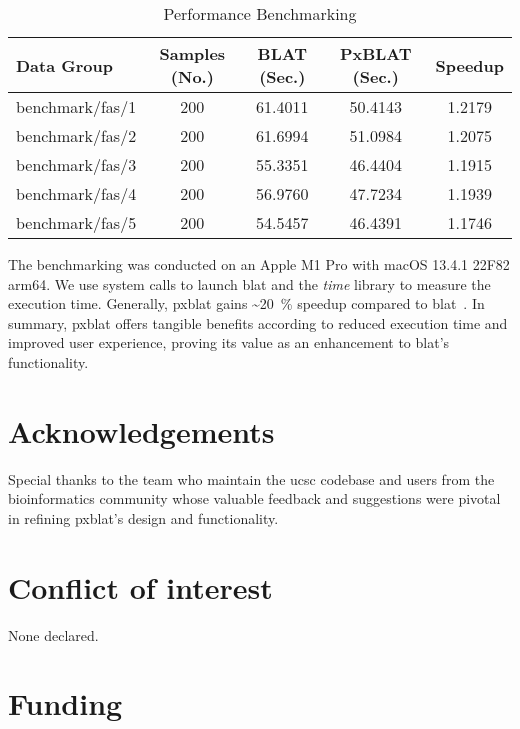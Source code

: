 \begin{table*}
	\centering
	\caption{Performance  Benchmarking}
	\label{tab:performance-evaluation}
	\begin{tabular}{lSSSS}
		\toprule
		Data Group      & {Samples (No.)} & {BLAT (Sec.)} & {PxBLAT (Sec.)} & {Speedup} \\
		\midrule
		benchmark/fas/1 & 200             & 61.4011       & 50.4143         & 1.2179    \\
		benchmark/fas/2 & 200             & 61.6994       & 51.0984         & 1.2075    \\
		benchmark/fas/3 & 200             & 55.3351       & 46.4404         & 1.1915    \\
		benchmark/fas/4 & 200             & 56.9760       & 47.7234         & 1.1939    \\
		benchmark/fas/5 & 200             & 54.5457       & 46.4391         & 1.1746    \\
		\bottomrule
	\end{tabular}
\end{table*}

The benchmarking was conducted on an Apple M1 Pro with macOS 13.4.1 22F82 arm64.
We use system calls to launch \gls{blat} and the \emph{time} library to measure the execution time.
Generally, \gls{pxblat} gains \textasciitilde\SI[per-mode=symbol,round-precision=0]{20}{\percent} speedup compared to \gls{blat}~.
In summary, \gls{pxblat}  offers tangible benefits according to reduced execution time and improved user experience, proving its value as an enhancement to \gls{blat}'s functionality.


\section*{Acknowledgements}\label{sec:acknowledgements}

Special thanks to the team who maintain the \gls{ucsc} codebase and users from the bioinformatics community whose valuable feedback and suggestions were pivotal in refining \gls{pxblat}'s design and functionality.

\section*{Conflict of interest}\label{sec:conflict-of-interest}

None declared.

\section*{Funding}\label{sec:funding}

